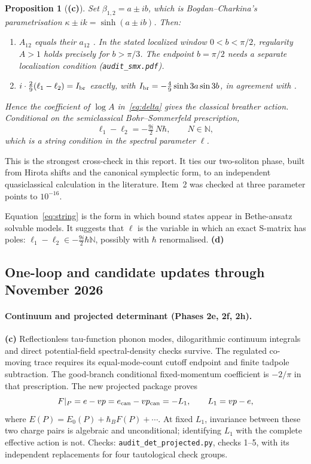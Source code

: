 \documentclass[11pt,a4paper]{article}
\newcommand{\Lc}{\textsf{\textbf{(c)}}\xspace}
\newcommand{\Ld}{\textsf{\textbf{(d)}}\xspace}
\newcommand{\file}[1]{\nolinkurl{#1}}
\newtheorem{proposition}{Proposition}[section]
\theoremstyle{remark}\newtheorem{remark}[proposition]{Remark}
\begin{document}
\begin{proposition}[\Lc]\label{prop:breather}
Set $\beta_{1,2}=a\pm ib$, which is Bogdan--Charkina's parametrisation $\kappa\pm ik=\sinh(a\pm ib)$. Then:
\begin{enumerate}
\item $A_{12}$ equals their $a_{12}$ \cite[(33)]{BC}. In the stated localized window $0<b<\pi/2$, regularity $A>1$ holds precisely for $b>\pi/3$. The endpoint $b=\pi/2$ needs a separate localization condition (\file{audit_smx.pdf}).
\item $i\cdot\tfrac29(\ell_1-\ell_2)=I_{\rm br}$ \emph{exactly}, with $I_{\rm br}=-\tfrac49\sinh3a\sin3b$, in agreement with \cite[(64)]{BC}.
\end{enumerate}
Hence the coefficient of $\log A$ in~\eqref{eq:delta} gives the classical breather action. Conditional on the semiclassical Bohr--Sommerfeld prescription,
\begin{equation}\label{eq:string}
\ell_1-\ell_2=-\tfrac{9i}{2}\,N\hbar,\qquad N\in\mathbb N ,
\end{equation}
which is a string condition in the spectral parameter $\ell$.
\end{proposition}

This is the strongest cross-check in this report. It ties our two-soliton phase, built from Hirota shifts and the canonical symplectic form, to an independent quasiclassical calculation in the literature. Item~2 was checked at three parameter points to $10^{-16}$.

Equation~\eqref{eq:string} is the form in which bound states appear in Bethe-ansatz solvable models. It suggests that $\ell$ is the variable in which an exact S-matrix has poles: $\ell_1-\ell_2\in-\tfrac{9i}2\hbar\mathbb N$, possibly with $\hbar$ renormalised. \Ld

\subsection{One-loop and candidate updates through November 2026}
\paragraph{Continuum and projected determinant (Phases 2e, 2f, 2h).}
\Lc Reflectionless tau-function phonon modes, dilogarithmic continuum integrals
and direct potential-field spectral-density checks survive. The regulated
co-moving trace requires its equal-mode-count cutoff endpoint and finite tadpole
subtraction. The good-branch conditional fixed-momentum coefficient is
$-2/\pi$ in that prescription. The new projected package proves
\[
 F|_P=e-vp=e_{\rm can}-vp_{\rm can}=-L_1,\qquad L_1=vp-e,
\]
where $E(P)=E_0(P)+\hbar_B F(P)+\cdots$. At fixed $L_1$, invariance between
these two charge pairs is algebraic and unconditional; identifying $L_1$ with
the complete effective action is not. Checks: \file{audit_det_projected.py},
checks 1--5, with its independent replacements for four tautological check groups.
\end{document}
